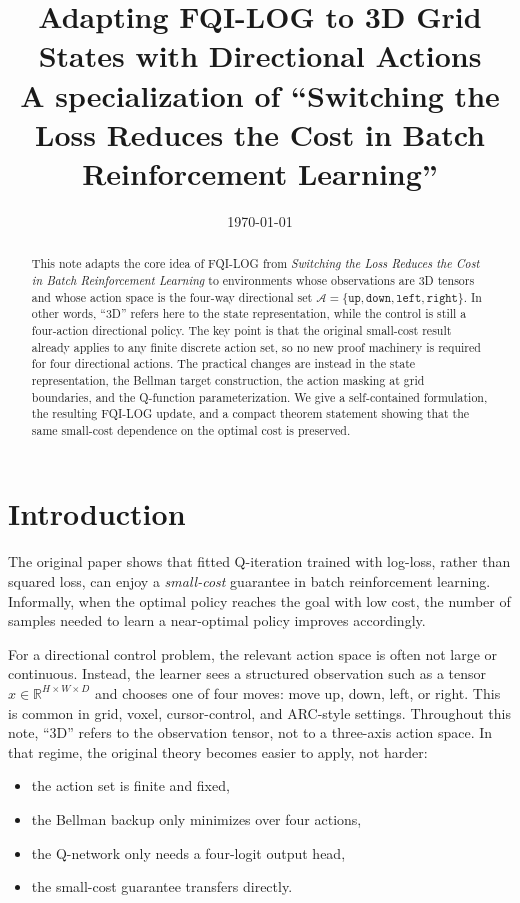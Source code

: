 \documentclass[11pt]{article}
\title{Adapting FQI-LOG to 3D Grid States with Directional Actions\\
\large A specialization of ``Switching the Loss Reduces the Cost in Batch Reinforcement Learning''}
\author{}
\date{\today}
\newcommand{\A}{\mathcal{A}}
\newcommand{\R}{\mathbb{R}}
\newcommand{\up}{\texttt{up}}
\newcommand{\downa}{\texttt{down}}
\newcommand{\lefta}{\texttt{left}}
\newcommand{\righta}{\texttt{right}}
\begin{document}
\maketitle

\begin{abstract}
This note adapts the core idea of FQI-LOG from \emph{Switching the Loss Reduces the Cost in Batch Reinforcement Learning} to environments whose observations are 3D tensors and whose action space is the four-way directional set $\A = \{\up, \downa, \lefta, \righta\}$. In other words, ``3D'' refers here to the state representation, while the control is still a four-action directional policy. The key point is that the original small-cost result already applies to any finite discrete action set, so no new proof machinery is required for four directional actions. The practical changes are instead in the state representation, the Bellman target construction, the action masking at grid boundaries, and the Q-function parameterization. We give a self-contained formulation, the resulting FQI-LOG update, and a compact theorem statement showing that the same small-cost dependence on the optimal cost is preserved.
\end{abstract}

\section{Introduction}
The original paper shows that fitted Q-iteration trained with log-loss, rather than squared loss, can enjoy a \emph{small-cost} guarantee in batch reinforcement learning. Informally, when the optimal policy reaches the goal with low cost, the number of samples needed to learn a near-optimal policy improves accordingly.

For a directional control problem, the relevant action space is often not large or continuous. Instead, the learner sees a structured observation such as a tensor $x \in \R^{H \times W \times D}$ and chooses one of four moves: move up, down, left, or right. This is common in grid, voxel, cursor-control, and ARC-style settings. Throughout this note, ``3D'' refers to the observation tensor, not to a three-axis action space. In that regime, the original theory becomes easier to apply, not harder:
\begin{itemize}[leftmargin=*]
  \item the action set is finite and fixed,
  \item the Bellman backup only minimizes over four actions,
  \item the Q-network only needs a four-logit output head,
  \item the small-cost guarantee transfers directly.
\end{itemize}
\end{document}
